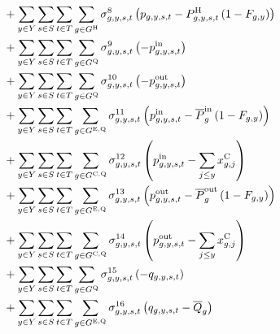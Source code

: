 \documentclass{article}
\begin{document}
\begin{align}
	& + \sum\limits_{\iYear \in \sYears}\sum\limits_{\iScenario \in \sScenarios}\sum\limits_{\iInterval \in \sIntervals} \sum\limits_{\iGenerator \in \sGeneratorsHydro} \dMaxPowerOutputHydro \left(\vPower - \cPowerOutputHydro \left(1 - \cRetirementIndicator\right) \right) \nonumber\\
	& + \sum\limits_{\iYear \in \sYears}\sum\limits_{\iScenario \in \sScenarios}\sum\limits_{\iInterval \in \sIntervals} \sum\limits_{\iGenerator \in \sStorage} \dNonNegativeCharging \left(-\vPowerIn\right) \nonumber\\
	& + \sum\limits_{\iYear \in \sYears}\sum\limits_{\iScenario \in \sScenarios}\sum\limits_{\iInterval \in \sIntervals} \sum\limits_{\iGenerator \in \sStorage} \dNonNegativeDischarging \left(-\vPowerOut\right) \nonumber\\
	& + \sum\limits_{\iYear \in \sYears}\sum\limits_{\iScenario \in \sScenarios}\sum\limits_{\iInterval \in \sIntervals} \sum\limits_{\iGenerator \in \sStorageExisting} \dMaxChargingRateExisting \left(\vPowerIn - \cPowerChargingMax \left(1 - \cRetirementIndicator\right) \right)\nonumber\\
	& + \sum\limits_{\iYear \in \sYears}\sum\limits_{\iScenario \in \sScenarios}\sum\limits_{\iInterval \in \sIntervals} \sum\limits_{\iGenerator \in \sStorageCandidate} \dMaxChargingRateCandidate \left(\vPowerIn - \sum\limits_{\iYearAlias \leq \iYear} \vInstalledCapacity[\iGenerator,\iYearAlias]\right)\nonumber\\
	& + \sum\limits_{\iYear \in \sYears}\sum\limits_{\iScenario \in \sScenarios}\sum\limits_{\iInterval \in \sIntervals} \sum\limits_{\iGenerator \in \sStorageExisting} \dMaxDischargingRateExisting \left(\vPowerOut - \cPowerDischargingMax \left(1 - \cRetirementIndicator\right)\right)\nonumber\\
	& + \sum\limits_{\iYear \in \sYears}\sum\limits_{\iScenario \in \sScenarios}\sum\limits_{\iInterval \in \sIntervals} \sum\limits_{\iGenerator \in \sStorageCandidate} \dMaxDischargingRateCandidate \left(\vPowerOut - \sum\limits_{\iYearAlias \leq \iYear} \vInstalledCapacity[\iGenerator,\iYearAlias]\right)\nonumber\\
	& + \sum\limits_{\iYear \in \sYears}\sum\limits_{\iScenario \in \sScenarios}\sum\limits_{\iInterval \in \sIntervals} \sum\limits_{\iGenerator \in \sStorage} \dNonNegativeStorageEnergy \left(- \vStorageUnitEnergy\right)\nonumber\\
	& + \sum\limits_{\iYear \in \sYears}\sum\limits_{\iScenario \in \sScenarios}\sum\limits_{\iInterval \in \sIntervals} \sum\limits_{\iGenerator \in \sStorageExisting} \dMaxStorageEnergyExisting \left(\vStorageUnitEnergy - \cStorageUnitEnergyMax\right)\nonumber\\

\end{align}
\end{document}
